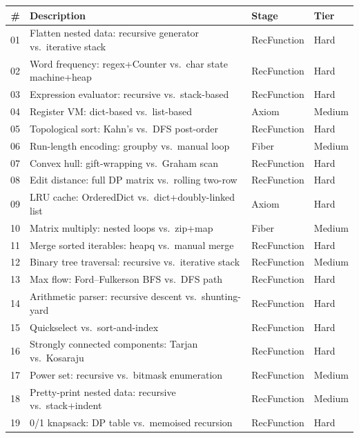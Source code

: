 \documentclass[11pt,a4paper]{report}
\theoremstyle{definition}
\theoremstyle{plain}
\begin{document}
\begin{center}
\small
\begin{tabular}{r p{5.5cm} l l}
  \textbf{\#} & \textbf{Description} & \textbf{Stage} & \textbf{Tier} \\
  \hline
  01 & Flatten nested data: recursive generator vs.\ iterative stack
     & RecFunction & Hard \\
  02 & Word frequency: regex+Counter vs.\ char state machine+heap
     & RecFunction & Hard \\
  03 & Expression evaluator: recursive vs.\ stack-based
     & RecFunction & Hard \\
  04 & Register VM: dict-based vs.\ list-based
     & Axiom & Medium \\
  05 & Topological sort: Kahn's vs.\ DFS post-order
     & RecFunction & Hard \\
  06 & Run-length encoding: groupby vs.\ manual loop
     & Fiber & Medium \\
  07 & Convex hull: gift-wrapping vs.\ Graham scan
     & RecFunction & Hard \\
  08 & Edit distance: full DP matrix vs.\ rolling two-row
     & RecFunction & Hard \\
  09 & LRU cache: OrderedDict vs.\ dict+doubly-linked list
     & Axiom & Hard \\
  10 & Matrix multiply: nested loops vs.\ zip+map
     & Fiber & Medium \\
  11 & Merge sorted iterables: heapq vs.\ manual merge
     & RecFunction & Hard \\
  12 & Binary tree traversal: recursive vs.\ iterative stack
     & RecFunction & Medium \\
  13 & Max flow: Ford--Fulkerson BFS vs.\ DFS path
     & RecFunction & Hard \\
  14 & Arithmetic parser: recursive descent vs.\ shunting-yard
     & RecFunction & Hard \\
  15 & Quickselect vs.\ sort-and-index
     & RecFunction & Hard \\
  16 & Strongly connected components: Tarjan vs.\ Kosaraju
     & RecFunction & Hard \\
  17 & Power set: recursive vs.\ bitmask enumeration
     & RecFunction & Medium \\
  18 & Pretty-print nested data: recursive vs.\ stack+indent
     & RecFunction & Medium \\
  19 & 0/1 knapsack: DP table vs.\ memoised recursion
     & RecFunction & Hard \\

\end{tabular}
\end{center}
\end{document}
